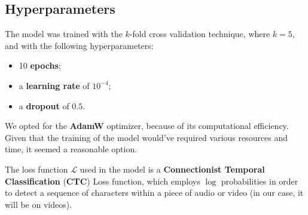 \documentclass[11pt,journal]{IEEEtran}
\newcommand{\nl}{

\medskip

}
\begin{document}
\subsection{Hyperparameters}

The model was trained with the $k$-fold cross validation technique, where $k = 5$, and with the following hyperparameters:
\begin{itemize}
    \item 10 \textbf{epochs};
    \item a \textbf{learning rate} of $10^{-4}$;
    \item a \textbf{dropout} of $0.5$.
\end{itemize}

\nl We opted for the \textbf{AdamW} optimizer, because of its computational efficiency. Given that the training of the model would've required various resources and time, it seemed a reasonable option.

\nl The loss function $\mathcal{L}$ used in the model is a \textbf{Connectionist Temporal Classification} (\textbf{CTC}) Loss function, which employs $\log$ probabilities in order to detect a sequence of characters within a piece of audio or video (in our case, it will be on videos).
\end{document}
